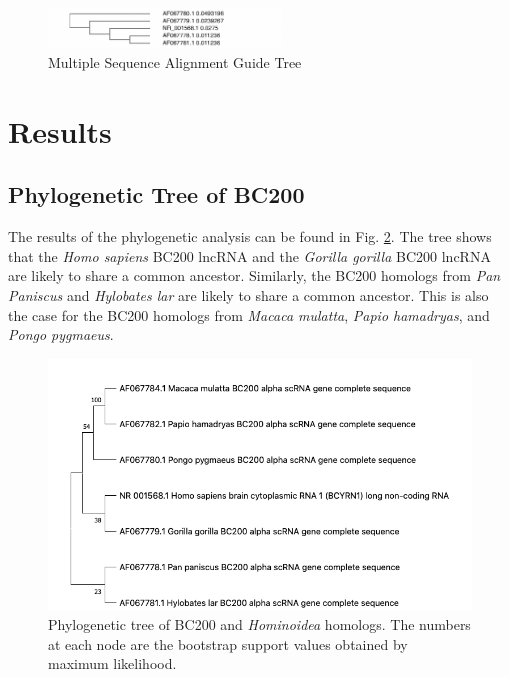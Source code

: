\documentclass[conference, 11pt]{IEEEtran}
\begin{document}
\begin{figure}[ht]
  \centering
  \includegraphics[width=0.55\textwidth]{figs/guidetree.png}
  \caption{Multiple Sequence Alignment Guide Tree}
  \label{fig:Guide-tree}
\end{figure}

\section{Results}\label{sec:results}

\subsection{Phylogenetic Tree of BC200}

The results of the phylogenetic analysis can be found in Fig. \ref{fig:phylo-tree}. 
The tree shows that the \emph{Homo sapiens} BC200 lncRNA and the \emph{Gorilla gorilla} BC200 lncRNA are likely to share a common ancestor. 
Similarly, the BC200 homologs from \emph{Pan Paniscus} and \emph{Hylobates lar} are likely to share a common ancestor. 
This is also the case for the BC200 homologs from \emph{Macaca mulatta}, \emph{Papio hamadryas}, and \emph{Pongo pygmaeus}. 

\begin{figure}[ht]
  \centering
  \includegraphics[width=\columnwidth, keepaspectratio]{figs/phylogenetic-tree.jpg}
  \caption{Phylogenetic tree of BC200 and \emph{Hominoidea} homologs. The numbers at each node are the bootstrap support values obtained by maximum likelihood.}
  \label{fig:phylo-tree}
\end{figure}
\end{document}
